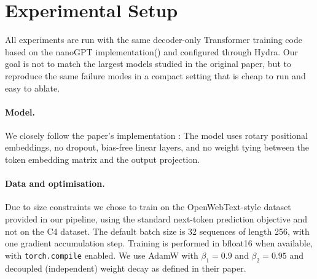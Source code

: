 \section{Experimental Setup}
\label{sec:setup}

All experiments are run with the same decoder-only Transformer training code based on the nanoGPT implementation(\cite{karpathy_nanogpt}) and configured through Hydra.
Our goal is not to match the largest models studied in the original paper, but
to reproduce the same failure modes in a compact setting that is cheap to run
and easy to ablate.

\paragraph{Model.}
We closely follow the paper's implementation : The model uses rotary positional embeddings, no dropout, bias-free linear layers, and no weight tying between the token embedding matrix and the output
projection.

\paragraph{Data and optimisation.}
Due to size constraints we chose to train on the OpenWebText-style dataset provided in our pipeline, using the
standard next-token prediction objective and not on the C4 dataset.
The default batch size is 32 sequences of length 256, with one gradient
accumulation step.
Training is performed in bfloat16 when available, with \texttt{torch.compile}
enabled.
We use AdamW with $\beta_1=0.9$ and $\beta_2=0.95$ and decoupled (independent) weight decay as defined in their paper. 
